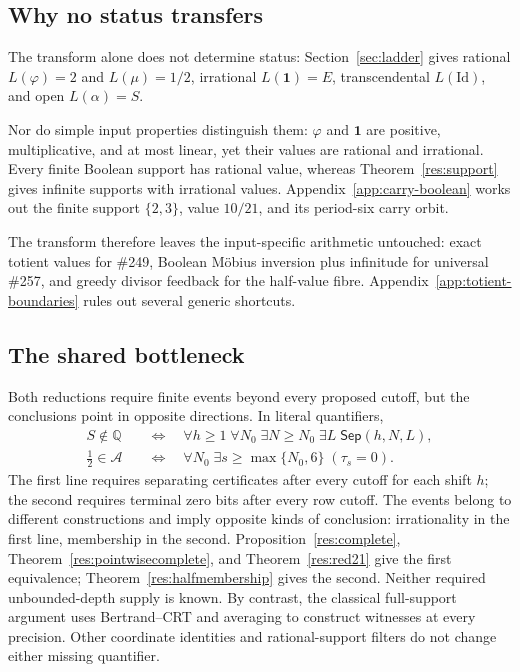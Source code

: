 \documentclass[11pt]{article}
\theoremstyle{definition}
\theoremstyle{remark}
\newcommand{\Q}{\mathbb{Q}}
\newcommand{\ph}{\varphi}
\begin{document}
\subsection{Why no status transfers}

The transform alone does not determine status: Section~\ref{sec:ladder} gives
rational \(L(\ph)=2\) and \(L(\mu)=1/2\), irrational
\(L(\mathbf 1)=E\), transcendental \(L(\mathrm{Id})\), and open
\(L(\alpha)=S\).

Nor do simple input properties distinguish them: \(\ph\) and \(\mathbf 1\)
are positive, multiplicative, and at most linear, yet their values are
rational and irrational.  Every finite Boolean support has rational value,
whereas Theorem~\ref{res:support} gives infinite supports with irrational
values.  Appendix~\ref{app:carry-boolean} works out the finite support
\(\{2,3\}\), value \(10/21\), and its period-six carry orbit.

The transform therefore leaves the input-specific arithmetic untouched:
exact totient values for \#249, Boolean M\"obius inversion plus infinitude
for universal \#257, and greedy divisor feedback for the half-value fibre.
Appendix~\ref{app:totient-boundaries} rules out several generic shortcuts.

\subsection{The shared bottleneck}

Both reductions require finite events beyond every proposed cutoff, but the
conclusions point in opposite directions.  In literal quantifiers,
\[
\begin{aligned}
 S\notin\Q
 &\quad\Longleftrightarrow\quad
 \forall h\ge 1\;\forall N_0\;\exists N\ge N_0\;\exists L\;
 \mathsf{Sep}(h,N,L),\\
 \frac12\in\mathcal A
 &\quad\Longleftrightarrow\quad
 \forall N_0\;\exists s\ge\max\{N_0,6\}\;(\tau_s=0).
\end{aligned}
\]
The first line requires separating certificates after every cutoff for each
shift $h$; the second requires terminal zero bits after every row cutoff.
The events belong to different constructions and imply opposite kinds of
conclusion: irrationality in the first line, membership in the second.
Proposition~\ref{res:complete}, Theorem~\ref{res:pointwisecomplete}, and
Theorem~\ref{res:red21} give the first equivalence; Theorem~\ref{res:halfmembership}
gives the second.  Neither required unbounded-depth supply is known.  By contrast,
the classical full-support argument uses Bertrand--CRT and averaging to
construct witnesses at every precision.  Other coordinate identities and
rational-support filters do not change either missing quantifier.
\end{document}
